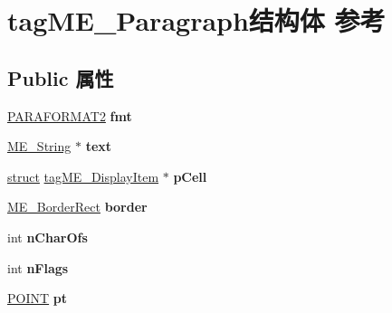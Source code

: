 \hypertarget{structtag_m_e___paragraph}{}\section{tag\+M\+E\+\_\+\+Paragraph结构体 参考}
\label{structtag_m_e___paragraph}
\subsection*{Public 属性}
\begin{DoxyCompactItemize}
\item 
\mbox{\label{structtag_m_e___paragraph_a9ab494e67e1bce4a234bfd125f27093d}} 
\hyperlink{struct__paraformat2}{P\+A\+R\+A\+F\+O\+R\+M\+A\+T2} {\bfseries fmt}
\item 
\mbox{\label{structtag_m_e___paragraph_a30cab38a4e66d89a4b1bf7ea6ce9d7a9}} 
\hyperlink{structtag_m_e___string}{M\+E\+\_\+\+String} $\ast$ {\bfseries text}
\item 
\mbox{\label{structtag_m_e___paragraph_aebe223ad02360b164245f80fcd4e12fa}} 
\hyperlink{interfacestruct}{struct} \hyperlink{structtag_m_e___display_item}{tag\+M\+E\+\_\+\+Display\+Item} $\ast$ {\bfseries p\+Cell}
\item 
\mbox{\label{structtag_m_e___paragraph_a63ce12e5b4f5704bc64b219618313e4a}} 
\hyperlink{structtag_m_e___border_rect}{M\+E\+\_\+\+Border\+Rect} {\bfseries border}
\item 
\mbox{\label{structtag_m_e___paragraph_af75e7804e8bf82a722e7d736e81f6c7f}} 
int {\bfseries n\+Char\+Ofs}
\item 
\mbox{\label{structtag_m_e___paragraph_a4c5a4d8c412f8384a60633a848b92afa}} 
int {\bfseries n\+Flags}
\item 
\mbox{\label{structtag_m_e___paragraph_a14600ac336ef596fd6339b7b1cbf05d3}} 
\hyperlink{structtag_p_o_i_n_t}{P\+O\+I\+NT} {\bfseries pt}
\item 
\mbox{\label{structtag_m_e___paragraph_a50c33d3603577edc27adc7fe69ee1eea}} 

\end{DoxyCompactItemize}
